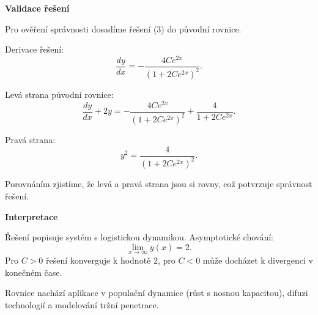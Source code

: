 \begin{example}
    \noindent\textbf{Validace řešení}
    
    Pro ověření správnosti dosadíme řešení (3) do původní rovnice.
    
    Derivace řešení:
    \[
    \frac{dy}{dx} = -\frac{4Ce^{2x}}{(1 + 2Ce^{2x})^2}.
    \]
    
    Levá strana původní rovnice:
    \[
    \frac{dy}{dx} + 2y = -\frac{4Ce^{2x}}{(1 + 2Ce^{2x})^2} + \frac{4}{1 + 2Ce^{2x}}.
    \]
    
    Pravá strana:
    \[
    y^2 = \frac{4}{(1 + 2Ce^{2x})^2}.
    \]
    
    Porovnáním zjistíme, že levá a pravá strana jsou si rovny, což potvrzuje správnost řešení.
    
    \vspace{1.5\baselineskip}
    
    \noindent\textbf{Interpretace}
    
    Řešení popisuje systém s logistickou dynamikou. Asymptotické chování:
    \[
    \lim_{x \to \infty} y(x) = 2.
    \]
    Pro $C > 0$ řešení konverguje k hodnotě 2, pro $C < 0$ může docházet k divergenci v konečném čase.
    
    Rovnice nachází aplikace v populační dynamice (růst s nosnou kapacitou), difuzi technologií a modelování tržní penetrace.
    
    \end{example}

\vspace{0.8\baselineskip}

